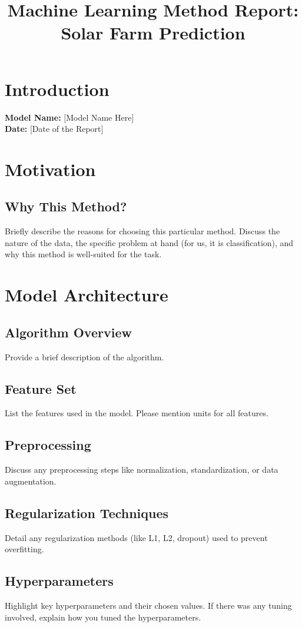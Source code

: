 \documentclass{article}
\title{Machine Learning Method Report: Solar Farm Prediction}
\date{}
\begin{document}
\maketitle

\section{Introduction}
\textbf{Model Name:} [Model Name Here] \\
\textbf{Date:} [Date of the Report]

\section{Motivation}
\subsection{Why This Method?}
Briefly describe the reasons for choosing this particular method. Discuss the nature of the data, the specific problem at hand (for us, it is classification), and why this method is well-suited for the task.

\section{Model Architecture}
\subsection{Algorithm Overview}
Provide a brief description of the algorithm.
\subsection{Feature Set}
List the features used in the model. Please mention units for all features. 
\subsection{Preprocessing}
Discuss any preprocessing steps like normalization, standardization, or data augmentation.
\subsection{Regularization Techniques}
Detail any regularization methods (like L1, L2, dropout) used to prevent overfitting.
\subsection{Hyperparameters}
Highlight key hyperparameters and their chosen values. If there was any tuning involved, explain how you tuned the hyperparameters. 
\end{document}
